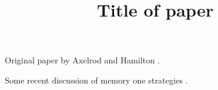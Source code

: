 \documentclass{article}
\begin{document}
\title{Title of paper}

\maketitle

Original paper by Axelrod and Hamilton \cite{1981-Axelrod-Hamilton}.

Some recent discussion of memory one strategies \cite{press2012iterated, stewart2012extortion}.



\end{document}
